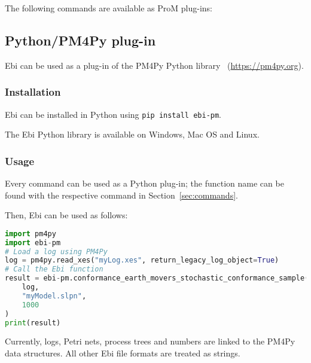 \documentclass{article}
\begin{document}
		The following commands are available as ProM plug-ins:
		\promcommands

    \subsection{Python/PM4Py plug-in}
        Ebi can be used as a plug-in of the PM4Py Python library~\cite{DBLP:journals/simpa/BertiZS23} (\url{https://pm4py.org}).
        
        \subsubsection{Installation}
            Ebi can be installed in Python using \verb=pip install ebi-pm=.

            The Ebi Python library is available on Windows, Mac OS and Linux. 


        \subsubsection{Usage}
            Every command can be used as a Python plug-in; the function name can be found with the respective command in Section~\ref{sec:commands}.
        
            Then, Ebi can be used as follows:
            \begin{lstlisting}[language=python, style=boxed]
import pm4py
import ebi-pm
# Load a log using PM4Py
log = pm4py.read_xes("myLog.xes", return_legacy_log_object=True)
# Call the Ebi function
result = ebi-pm.conformance_earth_movers_stochastic_conformance_sample(
    log,
    "myModel.slpn",
    1000
)
print(result)
            \end{lstlisting}

            Currently, logs, Petri nets, process trees and numbers are linked to the PM4Py data structures.
            All other Ebi file formats are treated as strings.
\end{document}
